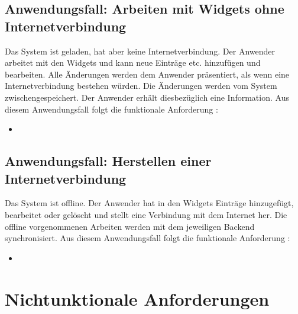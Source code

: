 \subsection{Anwendungsfall: Arbeiten mit Widgets ohne Internetverbindung}
Das System ist geladen, hat aber keine Internetverbindung. Der Anwender arbeitet mit den Widgets und kann neue Einträge etc. hinzufügen und bearbeiten. Alle Änderungen werden dem Anwender präsentiert, als wenn eine Internetverbindung bestehen würden. Die Änderungen werden vom System zwischengespeichert. Der Anwender erhält diesbezüglich eine Information. Aus diesem Anwendungsfall folgt die funktionale Anforderung :
\begin{itemize}
 \item \requirementf{\requirementOfflineWork}\label{requirementOfflineWork}
\end{itemize}

\subsection{Anwendungsfall: Herstellen einer Internetverbindung}
Das System ist offline. Der Anwender hat in den Widgets Einträge hinzugefügt, bearbeitet oder gelöscht und stellt eine Verbindung mit dem Internet her. Die offline vorgenommenen Arbeiten werden mit dem jeweiligen Backend synchronisiert. Aus diesem Anwendungsfall folgt die funktionale Anforderung :
\begin{itemize}
 \item \requirementf{\requirementOnlineSync}\label{requirementOnlineSync}
\end{itemize}

\section{Nichtunktionale Anforderungen}\label{section:nichtfunktionale_anforderunge}

